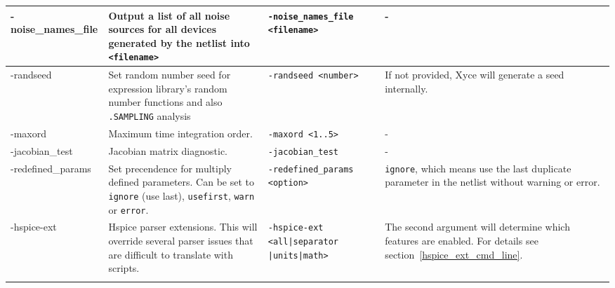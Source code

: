 \begin{longtable}[h] {>{\raggedright\small}m{1.1in}|>{\raggedright\small}m{2in}|>{\raggedright\small}m{1.5in}|>{\raggedright\let\\\tabularnewline\small}m{1in}}
-noise\_names\_file &
Output a list of all noise sources for all devices generated by the netlist
into \texttt{<filename>} &
\verb+-noise_names_file+
\verb+<filename>+ &
- \\ \hline

-randseed &
Set random number seed for expression library's random number functions and also \texttt{.SAMPLING} analysis &
\verb+-randseed <number>+ &
If not provided, Xyce will generate a seed internally. \\ \hline

-maxord &
Maximum time integration order. &
\verb+-maxord <1..5>+ &
- \\ \hline

-jacobian\_test &
Jacobian matrix diagnostic. &
\verb+-jacobian_test+ &
-  \\ \hline

-redefined\_params & 
Set precendence for multiply defined parameters. Can be set to \texttt{ignore} (use last), \texttt{usefirst}, \texttt{warn} or \texttt{error}. &
\verb+-redefined_params+
\verb+<option>+ & \texttt{ignore}, which means use the last duplicate parameter in the netlist without warning or error.
  \\ \hline

-hspice-ext &
Hspice parser extensions.  This will override several parser issues that are difficult to translate with scripts. 

&
\verb+-hspice-ext+
\verb+<all|separator+
\verb+|units|math>+ & 
The second argument will determine which features are enabled.  
For details see section~\ref{hspice_ext_cmd_line}.
\\ \hline

\label{cmd_line_arg_list}
\end{longtable}

